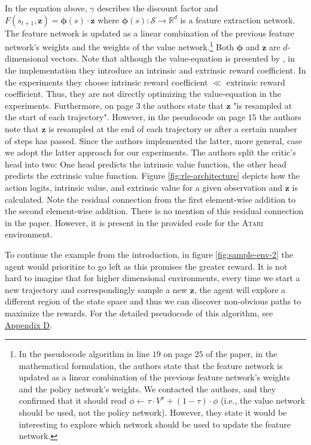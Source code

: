 \documentclass[10pt]{article} %
\begin{document}
\noindent In the equation above, $\gamma$ describes the discount factor and $F(s_{t+1}, \textbf{z}) =  \boldsymbol{\phi}(s) \cdot \textbf{z}$ where $\boldsymbol{\phi}(s): \mathcal{S} \rightarrow \mathbb{R}^{d}$ is a feature extraction network. The feature network is updated as a linear combination of the previous feature network's weights and the weights of the value network.\footnote{In the pseudocode algorithm in line $19$ on page $25$ of the paper, in the mathematical formulation, the authors state that the feature network is updated as a linear combination of the previous feature network's weights and the policy network's weights. We contacted the authors, and they confirmed that it should read $\phi \leftarrow \tau \cdot V^\pi + (1 - \tau ) \cdot \phi$ (i.e., the value network should be used, not the policy network). However, they state it would be interesting to explore which network should be used to update the feature network.} Both $\boldsymbol{\phi}$ and $\textbf{z}$ are $d$-dimensional vectors. Note that although the value-equation is presented by \cite{rle-paper}, in the implementation they introduce an intrinsic and extrinsic reward coefficient. In the experiments they choose intrinsic reward coefficient $\ll$ extrinsic reward coefficient. Thus, they are not directly optimizing the value-equation in the experiments. Furthermore, on page $3$ the authors state that $\textbf{z}$ "is resampled at the start of each trajectory". However, in the pseudocode on page $15$ the authors note that $\textbf{z}$ is resampled at the end of each trajectory or after a certain number of steps has passed. Since the authors implemented the latter, more general, case we adopt the latter approach for our experiments. The authors split the critic's head into two: One head predicts the intrinsic value function, the other head predicts the extrinsic value function. Figure \ref{fig:rle-architecture} depicts how the action logits, intrinsic value, and extrinsic value for a given observation and $\textbf{z}$ is calculated. Note the residual connection from the first element-wise addition to the second element-wise addition. There is no mention of this residual connection in the paper. However, it is present in the provided code for the \textsc{Atari} environment. 

To continue the example from the introduction, in figure \ref{fig:sample-env-2} the agent would prioritize to go left as this promises the greater reward. It is not hard to imagine that for higher dimensional environments, every time we start a new trajectory and correspondingly sample a new $\textbf{z}$, the agent will explore a different region of the state space and thus we can discover non-obvious paths to maximize the rewards. For the detailed pseudocode of this algorithm, see \hyperlink{link-rle}{Appendix D}.
\end{document}

